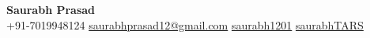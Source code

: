 \documentclass[letterpaper,10pt]{article}
\newcommand{\resumeItem}[1]{\item\small{#1}}
\newcommand{\resumeSubHeadingList}{\begin{itemize}[leftmargin=0.10in, label={}]}
\newcommand{\resumeSubHeadingListEnd}{\end{itemize}}
\newcommand{\customHeading}[1]{%
\fontfamily{phv}\selectfont\Huge #1
}
\begin{document}
\begin{center}
\textbf{\customHeading{Saurabh Prasad}} \\
\small \faPhone \hspace{0.5em} +91-7019948124 \hspace{1em}
\faEnvelope \hspace{0.5em} \href{[mailto:saurabhprasad12@email.com](mailto:saurabhprasad12@email.com)}{saurabhprasad12@gmail.com} \hspace{1em}
\faLinkedin \hspace{0.5em} \href{https://linkedin.com/in/saurabh1201}{saurabh1201} \hspace{1em}
\faGithub \hspace{0.5em} \href{https://github.com/saurabhTARS}{saurabhTARS}
\end{center}



\end{document}
